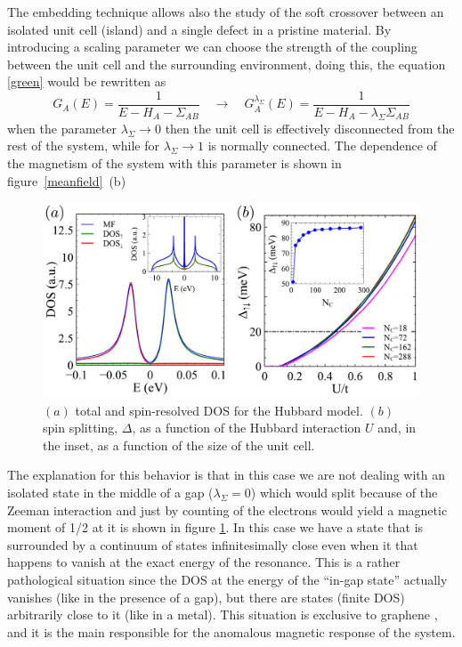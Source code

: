 The embedding technique allows also the study of the soft crossover between an isolated unit cell (island) and a single defect in a pristine material. By introducing a scaling parameter we can choose the strength of the coupling between the unit cell and the surrounding environment, doing this, the equation \eqref{green} would be rewritten as
\begin{equation}
  G_A(E) = \frac{1}{E-H_{A}-\Sigma_{AB}} \quad\longrightarrow\quad
  G^{\lambda_\Sigma}_A(E) = \frac{1}{E-H_{A}-\lambda_\Sigma\Sigma_{AB}}
\end{equation}
when the parameter $\lambda_\Sigma\rightarrow0$ then the unit cell is effectively disconnected from the rest of the system, while for $\lambda_\Sigma\rightarrow1$ is normally connected. The dependence of the magnetism of the system with this parameter is shown in figure~\ref{meanfield}~(b)
\begin{figure}[h!]
\centering
\includegraphics{chapter05/figures/MFfig2_dos.pdf}
\vspace{-5pt}
\caption{$(a)$ total and spin-resolved DOS for the Hubbard model. $(b)$ spin splitting, $\Delta$, as a function of the Hubbard interaction $U$ and, in the inset, as a function of the size of the unit cell.}
\label{coup}
\end{figure}
\FloatBarrier

The explanation for this behavior is that in this case we are not dealing with an isolated state in the middle of a gap ($\lambda_\Sigma=0$) which would split because of the Zeeman interaction and just by counting of the electrons would yield a magnetic moment of 1/2 at it is shown in figure \ref{coup}.
In this case we have a state that is surrounded by a continuum of states infinitesimally close even when it that happens to vanish at the exact energy of the resonance.
This is a rather pathological situation since the DOS at the energy of the ``in-gap state'' actually vanishes (like in the presence of a gap), but there are states (finite DOS) arbitrarily close to it (like in a metal). This situation is exclusive to graphene , and it is the main responsible for the anomalous magnetic response of the system.\\
